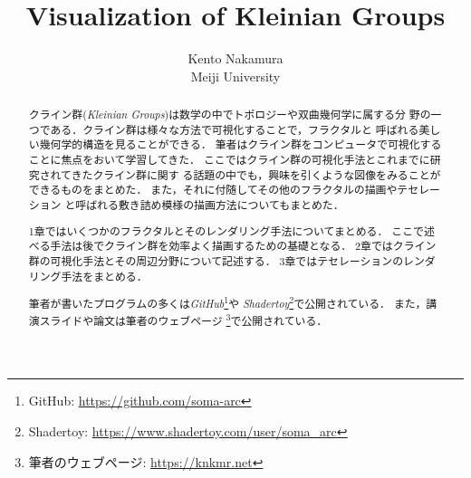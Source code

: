 \documentclass[uplatex, dvipdfmx]{jsarticle}
\title{ Visualization of Kleinian Groups }
\author{ Kento Nakamura\\
Meiji University\\
}
\date{}
\begin{document}
\maketitle

\begin{abstract}
 クライン群(\textit{Kleinian Groups})は数学の中でトポロジーや双曲幾何学に属する分
 野の一つである．クライン群は様々な方法で可視化することで，フラクタルと
 呼ばれる美しい幾何学的構造を見ることができる．
 筆者はクライン群をコンピュータで可視化することに焦点をおいて学習してきた．
 ここではクライン群の可視化手法とこれまでに研究されてきたクライン群に関す
 る話題の中でも，興味を引くような図像をみることができるものをまとめた．
 また，それに付随してその他のフラクタルの描画やテセレーション
 と呼ばれる敷き詰め模様の描画方法についてもまとめた．
 
 1章ではいくつかのフラクタルとそのレンダリング手法についてまとめる．
 ここで述べる手法は後でクライン群を効率よく描画するための基礎となる．
 2章ではクライン群の可視化手法とその周辺分野について記述する．
 3章ではテセレーションのレンダリング手法をまとめる．

 筆者が書いたプログラムの多くは\textit{GitHub}\footnote{GitHub:
 \url{https://github.com/soma-arc}}や
 \textit{Shadertoy}\footnote{Shadertoy:
 \url{https://www.shadertoy.com/user/soma\_arc}}で公開されている．
 また，講演スライドや論文は筆者のウェブページ
 \footnote{筆者のウェブページ: \url{https://knkmr.net}}で公開されている．

\end{abstract}

\clearpage

\tableofcontents

\clearpage







\printbibliography
\end{document}
